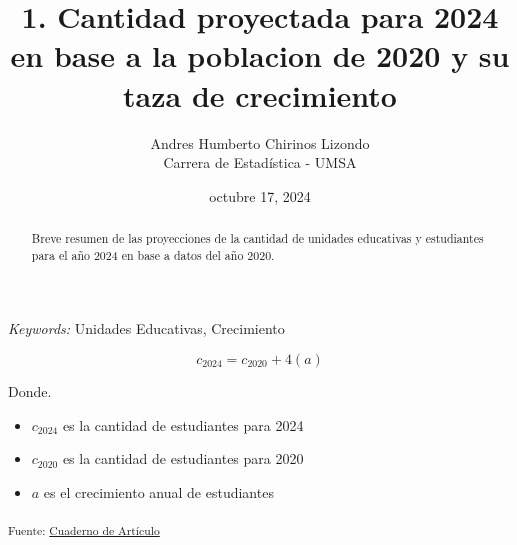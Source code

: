 \documentclass[
  12pt]{article}
\begin{document}
\def\spacingset#1{\renewcommand{\baselinestretch}%
{#1}\small\normalsize} \spacingset{1}



\date{octubre 17, 2024}
\title{\bf 1. Cantidad proyectada para 2024 en base a la poblacion de
2020 y su taza de crecimiento}
\author{
Andres Humberto Chirinos Lizondo\\
Carrera de Estadística - UMSA\\
}
\maketitle

\bigskip
\bigskip
\begin{abstract}
Breve resumen de las proyecciones de la cantidad de unidades educativas
y estudiantes para el año 2024 en base a datos del año 2020.
\end{abstract}

\noindent%
{\it Keywords:} Unidades Educativas, Crecimiento
\vfill

\newpage
\spacingset{1.9} %


\[
c_{2024} = c_{2020} + 4(a)
\]

Donde.

\begin{itemize}
\item
  \(c_{2024}\) es la cantidad de estudiantes para 2024
\item
  \(c_{2020}\) es la cantidad de estudiantes para 2020
\item
  \(a\) es el crecimiento anual de estudiantes
\end{itemize}

\textsubscript{Fuente:
\href{https://sociest.github.io/ue-report/index.ipynb.html}{Cuaderno de
Artículo}}
\end{document}
